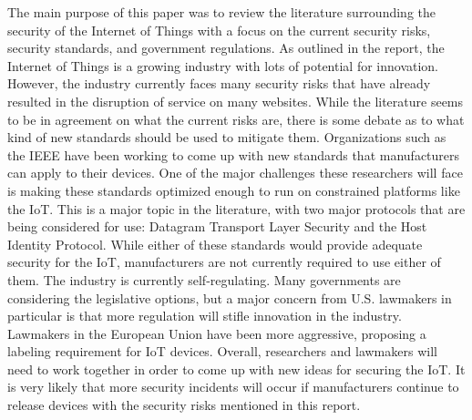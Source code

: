 \documentclass[letterpaper, 12pt]{article}
\begin{document}
\begin{flushleft}
The main purpose of this paper was to review the literature surrounding the security of the Internet of Things with a focus on the current security risks, security
standards, and government regulations. As outlined in the report, the Internet of Things is a growing industry with lots of potential for innovation. 
However, the industry currently faces many security risks that have already resulted in the disruption of service on many websites. While the literature
seems to be in agreement on what the current risks are, there is some debate as to what kind of new standards should be used to mitigate them. Organizations
such as the IEEE have been working to come up with new standards that manufacturers can apply to their devices. One of the major challenges these researchers
will face is making these standards optimized enough to run on constrained platforms like the IoT. This is a major topic in the literature, with two major 
protocols that are being considered for use: Datagram Transport Layer Security and the Host Identity Protocol. While either of these standards would provide
adequate security for the IoT, manufacturers are not currently required to use either of them. The industry is currently self-regulating. Many governments
are considering the legislative options, but a major concern from U.S. lawmakers in particular is that more regulation will stifle innovation in the industry. 
Lawmakers in the European Union have been more aggressive, proposing a labeling requirement for IoT devices. Overall, researchers and lawmakers will need to
work together in order to come up with new ideas for securing the IoT. It is very likely that more security incidents will occur if manufacturers continue
to release devices with the security risks mentioned in this report. 
\newpage
{}
\printbibliography
\end{flushleft}
\end{document}
